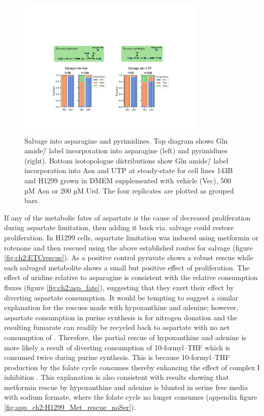 \begin{figure}
    \centering
    \includegraphics[width=0.8\textwidth]{figures/chap2/sal_frac_pyr-asn.pdf}
    \caption[Salvage into asparagine and pyrimidines.]{
    Salvage into asparagine and pyrimidines.
    Top diagram shows Gln amide\=/\hNi{} label incorporation into asparagine (left) and pyrimidines (right).
    Bottom isotopologue distributions show Gln amide\=/\hNi{} label incorporation into Asn and UTP at steady-state for cell lines 143B and H1299 grown in DMEM supplemented with vehicle (Vec), 500 µM Asn or 200 µM Urd.
    The four replicates are plotted as grouped bars.
    }
    \label{fig:ch2:sal_frac_pyr-asn}
\end{figure}




If any of the metabolic fates of aspartate is the cause of decreased proliferation during aspartate limitation, then adding it back via. salvage could restore proliferation.
In H1299 cells, aspartate limitation was induced using metformin or rotenone and then rescued using the above established routes for salvage (figure \ref{fig:ch2:ETCrescue}).
As a positive control pyruvate shows a robust rescue while each salvaged metabolite shows a small but positive effect of proliferation.
The effect of uridine relative to asparagine is consistent with the relative consumption fluxes (figure \ref{fig:ch2:asp_fate}), suggesting that they exert their effect by diverting aspartate consumption.
It would be tempting to suggest a similar explanation for the rescues made with hypoxanthine and adenine; however, aspartate consumption in purine synthesis is for nitrogen donation and the resulting fumarate can readily be recycled back to aspartate with no net consumption of \NAD{}.
Therefore, the partial rescue of hypoxanthine and adenine is more likely a result of diverting consumption of 10-formyl–THF which is consumed twice during purine synthesis.
This is because 10-formyl–THF production by the folate cycle consumes \NAD{} thereby enhancing the effect of complex I inhibition \cite{Yang2020-fs}.
This explanation is also consistent with results showing that metformin rescue by hypoxanthine and adenine is blunted in serine free media with sodium formate, where the folate cycle no longer consumes \NAD{} (appendix figure \ref{fig:app_ch2:H1299_Met_rescue_noSer}).

